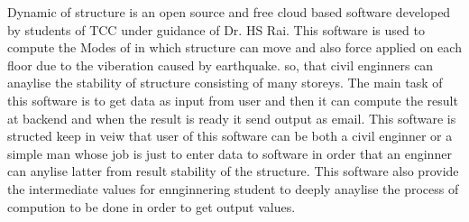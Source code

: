 Dynamic of structure is an open source and free cloud based software developed by students of 
TCC under guidance of Dr. HS Rai. This software is used to compute the 
Modes of in which structure can move and also force applied on each floor 
due to the viberation caused by earthquake. so, that civil enginners can
anaylise the stability of structure consisting of many storeys. The main task 
of this software is to get data as input from user and then it can compute 
the result at backend and when the result is ready it send output as email.
This software is structed keep in veiw that user of this software can be both 
a civil enginner or a simple man whose job is just to enter data to software 
in order that an enginner can anylise latter from result stability of the structure.
This software also provide the intermediate values for ennginnering student 
to deeply anaylise the  process of compution to be done in order to get output values. 
